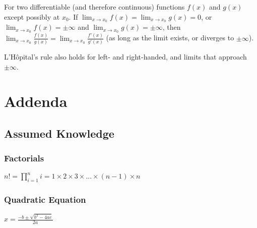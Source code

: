 \documentclass{article}
\begin{document}
%
\begin{theorem}
    For two differentiable (and therefore continuous) functions $f(x)$ and $g(x)$
    except possibly at $x_0$.
    If $\displaystyle \lim_{x\to x_0}f(x)=\lim_{x\to x_0}g(x)=0$,
    or $\displaystyle \lim_{x\to x_0}f(x)=\pm\infty$
    and $\displaystyle \lim_{x\to x_0}g(x)=\pm\infty$,
    then
    $\lim_{x\to x_0}\frac{f(x)}{g(x)} = \lim_{x\to x_0}\frac{f'(x)}{g'(x)}$
    (as long as the limit exists, or diverges to $\pm\infty$).
\end{theorem}
%
\begin{note}
    L'Hôpital's rule also holds for left- and right-handed, and limits that approach $\pm\infty$.
\end{note}
%
\pagebreak
\section{Addenda}
\subsection{Assumed Knowledge}
\subsubsection{Factorials}
$\displaystyle n! = \prod_{i=1}^{n} i = 1 \times 2 \times 3 \times \dots \times (n-1) \times n$

\subsubsection{Quadratic Equation}
$\displaystyle x = \frac{-b\pm\sqrt{b^2-4ac}}{2a}$
\end{document}
